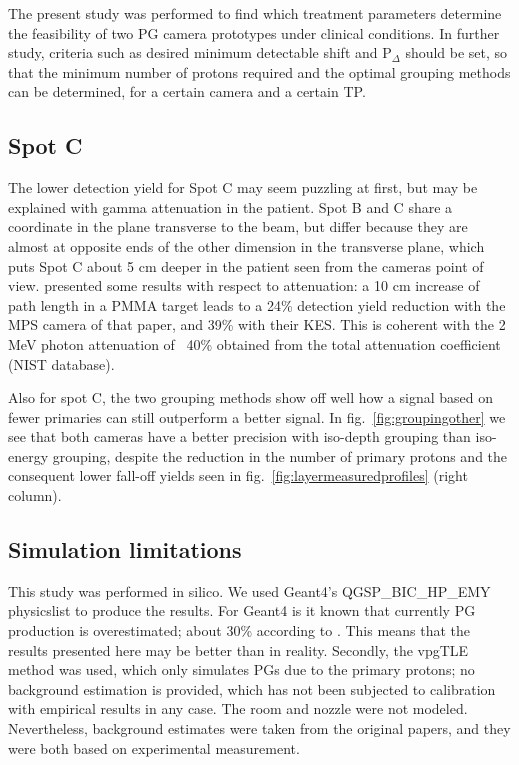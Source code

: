 \documentclass[a4paper,english]{article}
\begin{document}
The present study was performed to find which treatment parameters determine the feasibility of two PG camera prototypes under clinical conditions. In further study, criteria such as desired minimum detectable shift and P$_\Delta$ should be set, so that the minimum number of protons required and the optimal grouping methods can be determined, for a certain camera and a certain TP.

\subsection{Spot C}

The lower detection yield for Spot C may seem puzzling at first, but may be explained with gamma attenuation in the patient. Spot B and C share a coordinate in the plane transverse to the beam, but differ because they are almost at opposite ends of the other dimension in the transverse plane, which puts Spot C about 5 cm deeper in the patient seen from the cameras point of view. \citet[Table 3]{Lin2016} presented some results with respect to attenuation: a 10 cm increase of path length in a PMMA target leads to a 24\% detection yield reduction with the MPS camera of that paper, and 39\% with their KES. This is coherent with the 2 MeV photon attenuation of ~40\% obtained from the total attenuation coefficient (NIST database).

Also for spot C, the two grouping methods show off well how a signal based on fewer primaries can still outperform a better signal. In fig.~\ref{fig:groupingother} we see that both cameras have a better precision with iso-depth grouping than iso-energy grouping, despite the reduction in the number of primary protons and the consequent lower fall-off yields seen in fig.~\ref{fig:layermeasuredprofiles} (right column).


\subsection{Simulation limitations}

This study was performed in silico. We used Geant4's QGSP\_BIC\_HP\_EMY physicslist to produce the results. For Geant4 is it known that currently PG production is overestimated; about 30\% according to \cite{Pinto2016}. This means that the results presented here may be better than in reality. Secondly, the vpgTLE method was used, which only simulates PGs due to the primary protons; no background estimation is provided, which has not been subjected to calibration with empirical results in any case. The room and nozzle were not modeled. Nevertheless, background estimates were taken from the original papers, and they were both based on experimental measurement.
\end{document}
